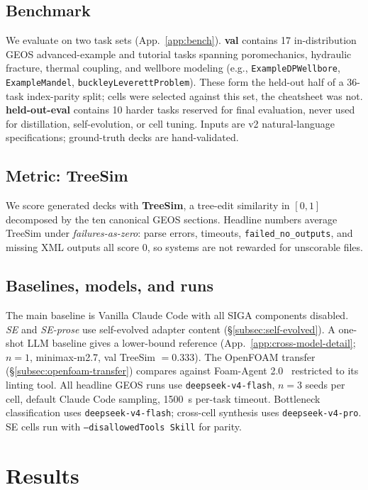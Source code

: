 \documentclass{article}
\begin{document}
\subsection{Benchmark}
\label{subsec:benchmark}
We evaluate on two task sets (App.~\ref{app:bench}). \textbf{val} contains 17 in-distribution GEOS advanced-example and tutorial tasks spanning poromechanics, hydraulic fracture, thermal coupling, and wellbore modeling (e.g., \texttt{ExampleDPWellbore}, \texttt{ExampleMandel}, \texttt{buckleyLeverettProblem}). These form the held-out half of a 36-task index-parity split; cells were selected against this set, the cheatsheet was not. \textbf{held-out-eval} contains 10 harder tasks reserved for final evaluation, never used for distillation, self-evolution, or cell tuning. Inputs are v2 natural-language specifications; ground-truth decks are hand-validated.

\subsection{Metric: TreeSim}
\label{subsec:metric}
We score generated decks with \textbf{TreeSim}, a tree-edit similarity in $[0,1]$ decomposed by the ten canonical GEOS sections. Headline numbers average TreeSim under \emph{failures-as-zero}: parse errors, timeouts, \texttt{failed\_no\_outputs}, and missing XML outputs all score 0, so systems are not rewarded for unscorable files.

\subsection{Baselines, models, and runs}
\label{subsec:baselines}
The main baseline is Vanilla Claude Code with all SIGA components disabled. \emph{SE} and \emph{SE-prose} use self-evolved adapter content (\S\ref{subsec:self-evolved}). A one-shot LLM baseline gives a lower-bound reference (App.~\ref{app:cross-model-detail}; $n=1$, minimax-m2.7, val TreeSim $=0.333$). The OpenFOAM transfer (\S\ref{subsec:openfoam-transfer}) compares against Foam-Agent 2.0~\citep{foamagent2025} restricted to its linting tool. All headline GEOS runs use \texttt{deepseek-v4-flash}, $n=3$ seeds per cell, default Claude Code sampling, 1500~s per-task timeout. Bottleneck classification uses \texttt{deepseek-v4-flash}; cross-cell synthesis uses \texttt{deepseek-v4-pro}. SE cells run with \texttt{--disallowedTools Skill} for parity.


\section{Results}
\label{sec:results}
\end{document}
